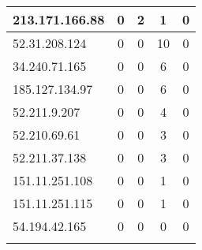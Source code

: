 \documentclass{article}
\begin{document}
\begin{longtable}{|>{\raggedright\arraybackslash}p{3cm}|c|c|c|c|}
    
    \rowcolor{lightred} %
    
    213.171.166.88 & 0 & 2 & 1 & 0 \\
    \hline
    
    
    \rowcolor{lightyellow} %
    
    52.31.208.124 & 0 & 0 & 10 & 0 \\
    \hline
    
    
    \rowcolor{lightyellow} %
    
    34.240.71.165 & 0 & 0 & 6 & 0 \\
    \hline
    
    
    \rowcolor{lightyellow} %
    
    185.127.134.97 & 0 & 0 & 6 & 0 \\
    \hline
    
    
    \rowcolor{lightyellow} %
    
    52.211.9.207 & 0 & 0 & 4 & 0 \\
    \hline
    
    
    \rowcolor{lightyellow} %
    
    52.210.69.61 & 0 & 0 & 3 & 0 \\
    \hline
    
    
    \rowcolor{lightyellow} %
    
    52.211.37.138 & 0 & 0 & 3 & 0 \\
    \hline
    
    
    \rowcolor{lightyellow} %
    
    151.11.251.108 & 0 & 0 & 1 & 0 \\
    \hline
    
    
    \rowcolor{lightyellow} %
    
    151.11.251.115 & 0 & 0 & 1 & 0 \\
    \hline
    
    
    \rowcolor{lightgreen} %
    
    54.194.42.165 & 0 & 0 & 0 & 0 \\
    \hline
    
    
    \rowcolor{lightgreen} %
    

\end{longtable}
\end{document}
